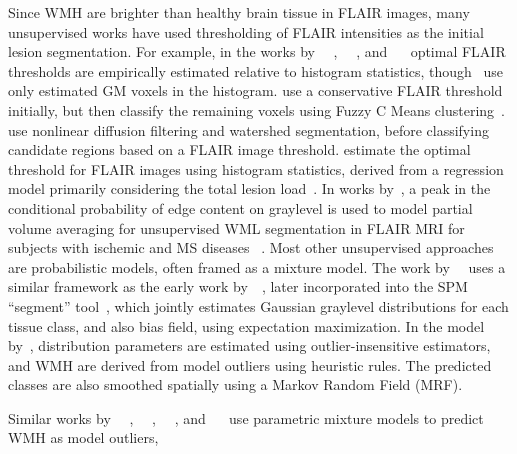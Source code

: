 Since WMH are brighter than healthy brain tissue in FLAIR images,
many unsupervised works have used thresholding of FLAIR intensities
as the initial lesion segmentation.
For example, in the works by%
~\citeauthor{Jack2001}~\cite{Jack2001},%
~\citeauthor{DeBoer2009b}~\cite{DeBoer2009b}, and%
~\citeauthor{Smart2011}~\cite{Smart2011}
optimal FLAIR thresholds are empirically estimated relative to histogram statistics,
though~\citeauthor{DeBoer2009b} use only estimated GM voxels in the histogram.
\citeauthor{Gibson2010} use a conservative FLAIR threshold initially,
but then classify the remaining voxels using Fuzzy C Means clustering~\cite{Gibson2010}.
\citeauthor{Samaille2012} use nonlinear diffusion filtering and watershed segmentation,
before classifying candidate regions based on a FLAIR image threshold.
\citeauthor{Yoo2014} estimate the optimal threshold for FLAIR images using histogram statistics,
derived from a regression model primarily considering the total lesion load~\cite{Yoo2014}.
In works by~\citeauthor{Khademi2014}, a peak in the conditional probability
of edge content on graylevel is used to model partial volume averaging
for unsupervised WML segmentation in FLAIR MRI for subjects with ischemic and MS diseases%
~\cite{Khademi2014,Knight2016a,Khademi2015}.
Most other unsupervised approaches are probabilistic models, often framed as a mixture model.
The work by~\citeauthor{VanLeemput2001}~\cite{VanLeemput2001} uses
a similar framework as the early work by~\citeauthor{Ashburner1997}~\cite{Ashburner1997},
later incorporated into the SPM ``segment'' tool~\cite{Ashburner2005},
which jointly estimates Gaussian graylevel distributions for each tissue class, and also bias field,
using expectation maximization.
In the model by~\citeauthor{VanLeemput2001},
distribution parameters are estimated using outlier-insensitive estimators,
and WMH are derived from model outliers using heuristic rules.
The predicted classes are also smoothed spatially using a Markov Random Field (MRF).
\par
Similar works by%
~\citeauthor{Bricq2008}~\cite{Bricq2008},%
~\citeauthor{Schmidt2012}~\cite{Schmidt2012},%
~\citeauthor{Jain2015}~\cite{Jain2015}, and%
~\citeauthor{Roura2015}~\cite{Roura2015}
use parametric mixture models to predict WMH as model outliers,
